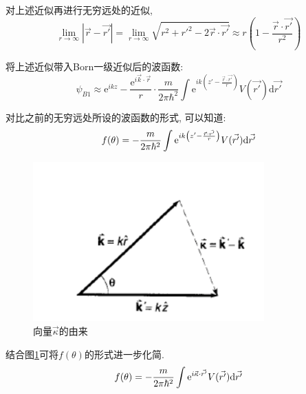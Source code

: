 \documentclass[a4paper, 11pt]{article}
\begin{document}
\begin{spacing}{1.2}
          对上述近似再进行无穷远处的近似, 
          \begin{equation}
            \lim_{r\to\infty}\left|\vec{r}-\vec{r'}\right| = \lim_{r\to\infty}\sqrt{r^2+r'^2-2\vec{r}\cdot\vec{r'}}%
            \approx r\left(1-\dfrac{\vec{r}\cdot\vec{r'}}{r^2}\right)
          \end{equation}

          将上述近似带入Born一级近似后的波函数:
          \begin{equation}
            \psi_{B1} \approx \mathrm{e}^{ikz} - \dfrac{\mathrm{e}^{i\vec{k}\cdot\vec{r}}}{r}\cdot\dfrac{m}{2\pi\hbar^2} %
                              \int\mathrm{e}^{ik\left(z'-\frac{\vec{r}\cdot\vec{r'}}{r}\right)}V(\vec{r'})%
                                                      \mathrm{d}\vec{r'}
          \end{equation}

          对比之前的无穷远处所设的波函数的形式, 可以知道:
          \begin{equation}
            f(\theta) = -\dfrac{m}{2\pi\hbar^2}\int\mathrm{e}^%
                        {ik\left(z'-\frac{\vec{r}\cdot\vec{r'}}{r}\right)}V(\vec{r'})\mathrm{d}\vec{r'}
          \end{equation}

          \begin{figure}
            \centering\includegraphics[width=3.5in]{image/direction_kq}
            \caption{向量$\vec{\kappa}$的由来}\label{direction_kq}
          \end{figure} 
          
          结合图\ref{direction_kq}可将$f(\theta)$的形式进一步化简. 
          \begin{equation}
              f(\theta) = -\dfrac{m}{2\pi\hbar^2}\int\mathrm{e}^%
              {i\vec{\kappa}\cdot\vec{r'}}V(\vec{r'})\mathrm{d}\vec{r'} 
          \end{equation}


\end{spacing}
\end{document}
